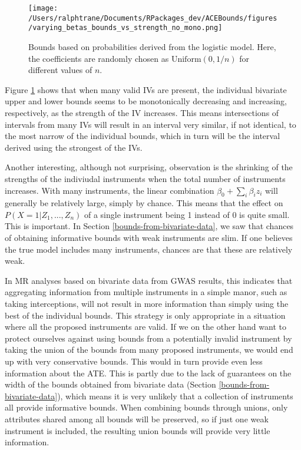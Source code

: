\documentclass[
]{article}
\theoremstyle{plain}
\begin{document}
\begin{figure}[H]
  \center
  \texttt{[image: /Users/ralphtrane/Documents/RPackages\_dev/ACEBounds/figures/varying\_betas\_bounds\_vs\_strength\_no\_mono.png]}
  \caption{Bounds based on probabilities derived from the logistic model. Here, the coefficients are randomly chosen as $\text{Uniform}(0, 1/n)$ for different values of $n$.}  
  \label{fig:bounds_vs_strength_many_IVs_varying_betas}
\end{figure}

Figure \ref{fig:bounds_vs_strength_many_IVs_varying_betas} shows that when many valid IVs are present, the individual bivariate upper and lower bounds seems to be monotonically decreasing and increasing, respectively, as the strength of the IV increases. This means intersections of intervals from many IVs will result in an interval very similar, if not identical, to the most narrow of the individual bounds, which in turn will be the interval derived using the strongest of the IVs.

Another interesting, although not surprising, observation is the shrinking of the strengths of the indiviudal instruments when the total number of instruments increases. With many instruments, the linear combination \(\beta_0 + \sum_i \beta_i z_i\) will generally be relatively large, simply by chance. This means that the effect on \(P(X = 1 | Z_1, ..., Z_n)\) of a single instrument being 1 instead of 0 is quite small. This is important. In Section \ref{bounds-from-bivariate-data}, we saw that chances of obtaining informative bounds with weak instruments are slim. If one believes the true model includes many instruments, chances are that these are relatively weak.

In MR analyses based on bivariate data from GWAS results, this indicates that aggregating information from multiple instruments in a simple manor, such as taking interceptions, will not result in more information than simply using the best of the individual bounds. This strategy is only appropriate in a situation where all the proposed instruments are valid. If we on the other hand want to protect ourselves against using bounds from a potentially invalid instrument by taking the union of the bounds from many proposed instruments, we would end up with very conservative bounds. This would in turn provide even less information about the ATE. This is partly due to the lack of guarantees on the width of the bounds obtained from bivariate data (Section \ref{bounds-from-bivariate-data}), which means it is very unlikely that a collection of instruments all provide informative bounds. When combining bounds through unions, only attributes shared among all bounds will be preserved, so if just one weak instrument is included, the resulting union bounds will provide very little information.
\end{document}
